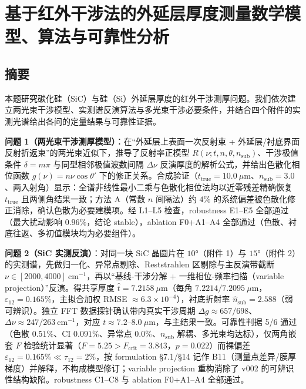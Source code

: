 \section{基于红外干涉法的外延层厚度测量数学模型、算法与可靠性分析}\label{ux57faux4e8eux7ea2ux5916ux5e72ux6d89ux6cd5ux7684ux5916ux5ef6ux5c42ux539aux5ea6ux6d4bux91cfux6570ux5b66ux6a21ux578bux7b97ux6cd5ux4e0eux53efux9760ux6027ux5206ux6790}

\subsection{摘要}\label{ux6458ux8981}

本题研究碳化硅（SiC）与硅（Si）外延层厚度的红外干涉测厚问题。我们依次建立两光束干涉模型、实测谱反演算法与多光束干涉必要条件，并结合四个附件的实测光谱给出各问的定量结果与可靠性证据。

\textbf{问题 1（两光束干涉测厚模型）}：在``外延层上表面一次反射束 +
外延层/衬底界面反射折返束''的两光束近似下，推导了反射率正模型
\(R(\nu;t,n,\theta,n_{\mathrm{sub}})\)、干涉极值条件 \(\delta=m\pi\)
与同型相邻极值波数间隔 \(\Delta\nu\)
反演厚度的解析公式，并给出色散化相位函数 \(g(\nu)=n\nu\cos\theta'\)
下的修正关系。合成验证（\(t_{\mathrm{true}}=10.0\ \mu\mathrm{m}\)、\(n_{\mathrm{sub}}=3.0\)、两入射角）显示：全谱非线性最小二乘与色散化相位法均以近零残差精确恢复
\(t_{\mathrm{true}}\) 且两侧角结果一致；方法 A（常数 \(n\) 间隔法）约
\(4\%\) 的系统偏差被色散化修正消除，确认色散为必要建模项。经 L1--L5
检查，robustness E1--E5 全部通过（最大扰动影响 \(0.96\%\)，结论
stable），ablation F0+A1--A4
全部通过（色散、衬底往返、多初值模块均为必要组件）。

\textbf{问题 2（SiC 实测反演）}：对同一块 SiC 晶圆片在 \(10°\)（附件
1）与 \(15°\)（附件 2）的实测谱，先做归一化、异常点剔除、Reststrahlen
区剔除与主反演带截断
\(\nu\in[2000,4000]\ \mathrm{cm}^{-1}\)，再以``基线-干涉分解 +
一维相位-频率扫描（variable projection）''反演。得共享厚度
\(\hat t=7.2158\ \mu\mathrm{m}\)（每角
\(7.2214/7.2095\ \mu\mathrm{m}\)，\(\varepsilon_{12}=0.165\%\)，主拟合加权
RMSE \(\approx6.3\times10^{-4}\)），衬底折射率
\(\hat n_{\mathrm{sub}}=2.588\)（弱可辨识）。独立 FFT
数据探针确认带内真实干涉周期
\(\Delta g\approx657/698\)、\(\Delta\nu\approx247/263\ \mathrm{cm}^{-1}\)，对应
\(t\approx7.2\)--\(8.0\ \mu\mathrm{m}\)，与主结果一致。可靠性判据 5/6
通过（色散 \(0.51\%\)、CI \(0.091\%\)、异常点
\(0.0\%\)、\(n_{\mathrm{sub}}\) 解耦、多光束均达标），仅两角嵌套 \(F\)
检验统计显著（\(F=5.25>F_{\mathrm{crit}}=3.843\)，\(p=0.022\)）而裸偏差
\(\varepsilon_{12}=0.165\%\ll\tau_{12}=2\%\)，按 formulation §7.1/§14
记作 B11（测量点差异/膜厚梯度）并解释，不构成模型修订；variable
projection 重构消除了 v002 的可辨识性结构缺陷。robustness C1--C8 与
ablation F0+A1--A4 全部通过。

